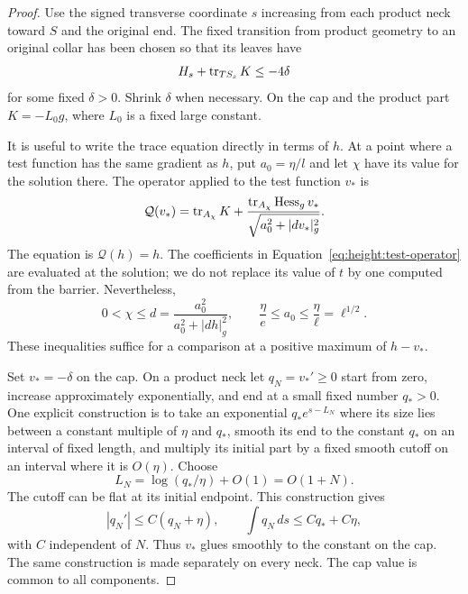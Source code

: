 \begin{proof}
Use the signed transverse coordinate $s$ increasing from each product
neck toward $S$ and the original end.  The fixed transition from product
geometry to an original collar has been chosen so that its leaves have
\begin{equation}\label{eq:height:leaf-expansion}
 H_s+\operatorname{tr}_{TS_s}K\le-4\delta
\end{equation}
for some fixed $\delta>0$.  Shrink $\delta$ when necessary.  On the cap
and the product part $K=-L_0g$, where $L_0$ is a fixed large constant.

It is useful to write the trace equation directly in terms of $h$.  At a
point where a test function has the same gradient as $h$, put
$a_0=\eta/l$ and let $\chi$ have its value for the solution there.  The
operator applied to the test function $v_*$ is
\begin{equation}\label{eq:height:test-operator}
 \mathcal Q(v_*)=
 \operatorname{tr}_{A_\chi}K+
 \frac{\operatorname{tr}_{A_\chi}\operatorname{Hess}_g v_*}
 {\sqrt{a_0^2+|dv_*|_g^2}}.
\end{equation}
The equation is $\mathcal Q(h)=h$.  The coefficients in
Equation~\eqref{eq:height:test-operator} are evaluated at the solution;
we do not replace its value of $t$ by one computed from the barrier.
Nevertheless,
\begin{equation}\label{eq:height:axial-smallness}
 0<\chi\le d=\frac{a_0^2}{a_0^2+|dh|_g^2},
 \qquad \frac\eta e\le a_0\le\frac\eta\ell=\ell^{1/2}.
\end{equation}
These inequalities suffice for a comparison at a positive maximum of
$h-v_*$.

Set $v_*=-\delta$ on the cap.  On a product neck let
$q_N=v_*'\ge0$ start from zero, increase approximately exponentially,
and end at a small fixed number $q_*>0$.  One explicit construction is
to take an exponential $q_*e^{s-L_N}$ where its size lies between a
constant multiple of $\eta$ and $q_*$, smooth its end to the constant
$q_*$ on an interval of fixed length, and multiply its initial part by
a fixed smooth cutoff on an interval where it is $O(\eta)$.  Choose
\[
 L_N=\log(q_*/\eta)+O(1)=O(1+N).
\]
The cutoff can be flat at its initial endpoint.  This construction gives
\begin{equation}\label{eq:height:ramp-estimates}
 |q_N'|\le C(q_N+\eta),\qquad
 \int q_N\,ds\le Cq_*+C\eta,
\end{equation}
with $C$ independent of $N$.  Thus $v_*$ glues smoothly to the constant
on the cap.  The same construction is made separately on every neck.
The cap value is common to all components.


\end{proof}
